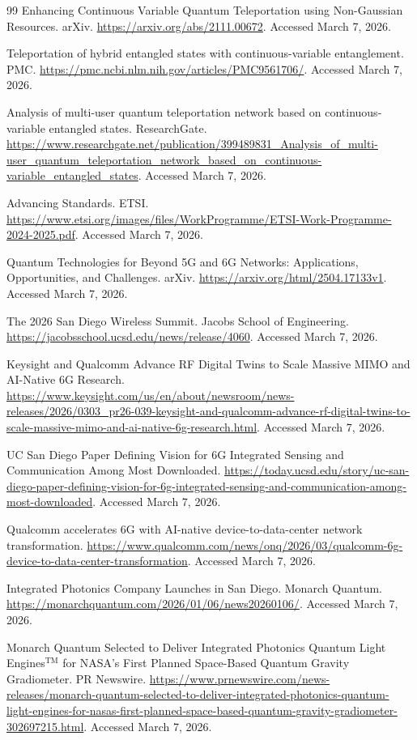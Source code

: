 \documentclass[11pt,a4paper]{article}
\begin{document}
\begin{thebibliography}{99}
 Enhancing Continuous Variable Quantum Teleportation using Non-Gaussian Resources. arXiv. \url{https://arxiv.org/abs/2111.00672}. Accessed March 7, 2026.

 Teleportation of hybrid entangled states with continuous-variable entanglement. PMC. \url{https://pmc.ncbi.nlm.nih.gov/articles/PMC9561706/}. Accessed March 7, 2026.

 Analysis of multi-user quantum teleportation network based on continuous-variable entangled states. ResearchGate. \url{https://www.researchgate.net/publication/399489831_Analysis_of_multi-user_quantum_teleportation_network_based_on_continuous-variable_entangled_states}. Accessed March 7, 2026.

 Advancing Standards. ETSI. \url{https://www.etsi.org/images/files/WorkProgramme/ETSI-Work-Programme-2024-2025.pdf}. Accessed March 7, 2026.

 Quantum Technologies for Beyond 5G and 6G Networks: Applications, Opportunities, and Challenges. arXiv. \url{https://arxiv.org/html/2504.17133v1}. Accessed March 7, 2026.

 The 2026 San Diego Wireless Summit. Jacobs School of Engineering. \url{https://jacobsschool.ucsd.edu/news/release/4060}. Accessed March 7, 2026.

 Keysight and Qualcomm Advance RF Digital Twins to Scale Massive MIMO and AI-Native 6G Research. \url{https://www.keysight.com/us/en/about/newsroom/news-releases/2026/0303_pr26-039-keysight-and-qualcomm-advance-rf-digital-twins-to-scale-massive-mimo-and-ai-native-6g-research.html}. Accessed March 7, 2026.

 UC San Diego Paper Defining Vision for 6G Integrated Sensing and Communication Among Most Downloaded. \url{https://today.ucsd.edu/story/uc-san-diego-paper-defining-vision-for-6g-integrated-sensing-and-communication-among-most-downloaded}. Accessed March 7, 2026.

 Qualcomm accelerates 6G with AI-native device-to-data-center network transformation. \url{https://www.qualcomm.com/news/onq/2026/03/qualcomm-6g-device-to-data-center-transformation}. Accessed March 7, 2026.

 Integrated Photonics Company Launches in San Diego. Monarch Quantum. \url{https://monarchquantum.com/2026/01/06/news20260106/}. Accessed March 7, 2026.

 Monarch Quantum Selected to Deliver Integrated Photonics Quantum Light Engines$^{\mathrm{TM}}$ for NASA's First Planned Space-Based Quantum Gravity Gradiometer. PR Newswire. \url{https://www.prnewswire.com/news-releases/monarch-quantum-selected-to-deliver-integrated-photonics-quantum-light-engines-for-nasas-first-planned-space-based-quantum-gravity-gradiometer-302697215.html}. Accessed March 7, 2026.


\end{thebibliography}
\end{document}
